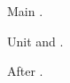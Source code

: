 \documentclass{article}
\begin{document}
Main \cite{Smith2020}.
\begin{bibunit}[plain]
Unit \cite{zeta} and \cite*{alpha}.
\end{bibunit}
After \cite{mid}.


\end{document}
